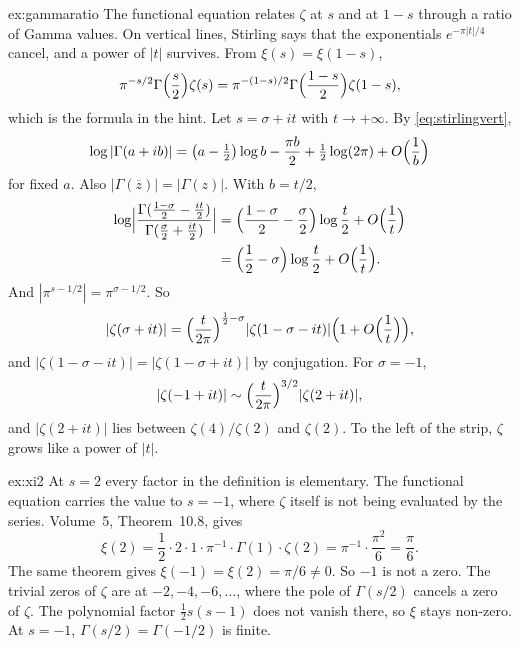 \begin{solution}{ex:gammaratio}
\idea The functional equation relates $\zeta$ at $s$ and at $1-s$ through a ratio of Gamma values. On vertical lines, Stirling says that the exponentials $e^{-\pi|t|/4}$ cancel, and a power of $|t|$ survives.
\writeup From $\xi(s)=\xi(1-s)$,
\[
\pi^{-s/2}\Gamma\Bigl(\frac s2\Bigr)\zeta(s)=\pi^{-(1-s)/2}\Gamma\Bigl(\frac{1-s}2\Bigr)\zeta(1-s),
\]
which is the formula in the hint. Let $s=\sigma+it$ with $t\to+\infty$. By \eqref{eq:stirlingvert},
\[
\log|\Gamma(a+ib)|=\bigl(a-\tfrac12\bigr)\log b-\frac{\pi b}2+\tfrac12\log(2\pi)+O\Bigl(\frac1b\Bigr)
\]
for fixed $a$. Also $|\Gamma(\overline z)|=|\Gamma(z)|$. With $b=t/2$,
\[
\begin{aligned}\log\Bigl|\frac{\Gamma(\frac{1-\sigma}2-\frac{it}2)}{\Gamma(\frac\sigma2+\frac{it}2)}\Bigr|
&=\Bigl(\frac{1-\sigma}2-\frac\sigma2\Bigr)\log\frac t2+O\Bigl(\frac1t\Bigr)\\
&=\Bigl(\frac12-\sigma\Bigr)\log\frac t2+O\Bigl(\frac1t\Bigr).\end{aligned}
\]
And $|\pi^{s-1/2}|=\pi^{\sigma-1/2}$. So
\[
|\zeta(\sigma+it)|=\Bigl(\frac t{2\pi}\Bigr)^{\frac12-\sigma}|\zeta(1-\sigma-it)|\Bigl(1+O\Bigl(\frac1t\Bigr)\Bigr),
\]
and $|\zeta(1-\sigma-it)|=|\zeta(1-\sigma+it)|$ by conjugation. For $\sigma=-1$,
\[
|\zeta(-1+it)|\sim\Bigl(\frac t{2\pi}\Bigr)^{3/2}|\zeta(2+it)|,
\]
and $|\zeta(2+it)|$ lies between $\zeta(4)/\zeta(2)$ and $\zeta(2)$. To the left of the strip, $\zeta$ grows like a power of $|t|$.
\end{solution}

\begin{solution}{ex:xi2}
\idea At $s=2$ every factor in the definition is elementary. The functional equation carries the value to $s=-1$, where $\zeta$ itself is not being evaluated by the series.
\writeup Volume~5, Theorem~10.8, gives
\[
\xi(2)=\frac12\cdot2\cdot1\cdot\pi^{-1}\cdot\Gamma(1)\cdot\zeta(2)=\pi^{-1}\cdot\frac{\pi^2}6=\frac\pi6.
\]
The same theorem gives $\xi(-1)=\xi(2)=\pi/6\ne0$. So $-1$ is not a zero. The trivial zeros of $\zeta$ are at $-2,-4,-6,\dots$, where the pole of $\Gamma(s/2)$ cancels a zero of $\zeta$. The polynomial factor $\frac12 s(s-1)$ does not vanish there, so $\xi$ stays non-zero. At $s=-1$, $\Gamma(s/2)=\Gamma(-1/2)$ is finite.
\end{solution}

